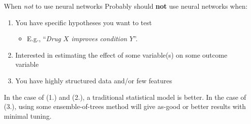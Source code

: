 \documentclass[pdf]{beamer}
\begin{document}
	\begin{frame}{When \textit{not} to use neural networks}
		Probably should \textbf{not} use neural networks when:
		\vspace{1em}
		\begin{enumerate}
			\item You have specific hypotheses you want to test
				\begin{itemize}
					\item E.g., ``\textit{Drug $X$ improves condition $Y$}''.
				\end{itemize}
			\item Interested in estimating the effect of some variable(s) on some outcome variable
			\item You have highly structured data and/or few features
		\end{enumerate}
		
		\vspace{2em}
		
		In the case of (1.) and (2.), a traditional statistical model is better. In the case of (3.), using some ensemble-of-trees method will give as-good or better results with minimal tuning.
	\end{frame}
		
\end{document}
